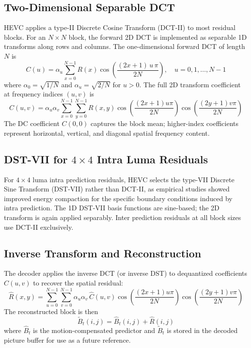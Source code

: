 \documentclass[11pt,journal,onecolumn]{IEEEtran}
\begin{document}
\subsection{Two-Dimensional Separable DCT}
HEVC applies a type-II Discrete Cosine Transform (DCT-II) to most residual blocks. For an $N \times N$ block, the forward 2D DCT is implemented as separable 1D transforms along rows and columns. The one-dimensional forward DCT of length $N$ is
\begin{equation}
C(u) = \alpha_u \sum_{x=0}^{N-1} R(x) \cos\!\left( \frac{(2x + 1)\, u\, \pi}{2N} \right), \quad u = 0, 1, \ldots, N-1
\end{equation}
where $\alpha_0 = \sqrt{1/N}$ and $\alpha_u = \sqrt{2/N}$ for $u > 0$. The full 2D transform coefficient at frequency indices $(u, v)$ is
\begin{equation}
C(u, v) = \alpha_u \alpha_v \sum_{x=0}^{N-1} \sum_{y=0}^{N-1} R(x, y) \cos\!\left( \frac{(2x+1)u\pi}{2N} \right) \cos\!\left( \frac{(2y+1)v\pi}{2N} \right)
\end{equation}
The DC coefficient $C(0, 0)$ captures the block mean; higher-index coefficients represent horizontal, vertical, and diagonal spatial frequency content.

\subsection{DST-VII for $4 \times 4$ Intra Luma Residuals}
For $4 \times 4$ luma intra prediction residuals, HEVC selects the type-VII Discrete Sine Transform (DST-VII) rather than DCT-II, as empirical studies showed improved energy compaction for the specific boundary conditions induced by intra prediction. The 1D DST-VII basis functions are sine-based; the 2D transform is again applied separably. Inter prediction residuals at all block sizes use DCT-II exclusively.

\subsection{Inverse Transform and Reconstruction}
The decoder applies the inverse DCT (or inverse DST) to dequantized coefficients $\hat{C}(u, v)$ to recover the spatial residual:
\begin{equation}
\hat{R}(x, y) = \sum_{u=0}^{N-1} \sum_{v=0}^{N-1} \alpha_u \alpha_v \, \hat{C}(u, v) \cos\!\left( \frac{(2x+1)u\pi}{2N} \right) \cos\!\left( \frac{(2y+1)v\pi}{2N} \right)
\end{equation}
The reconstructed block is then
\begin{equation}
\tilde{B}_t(i, j) = \hat{B}_t(i, j) + \hat{R}(i, j)
\end{equation}
where $\hat{B}_t$ is the motion-compensated predictor and $\tilde{B}_t$ is stored in the decoded picture buffer for use as a future reference.
\end{document}
